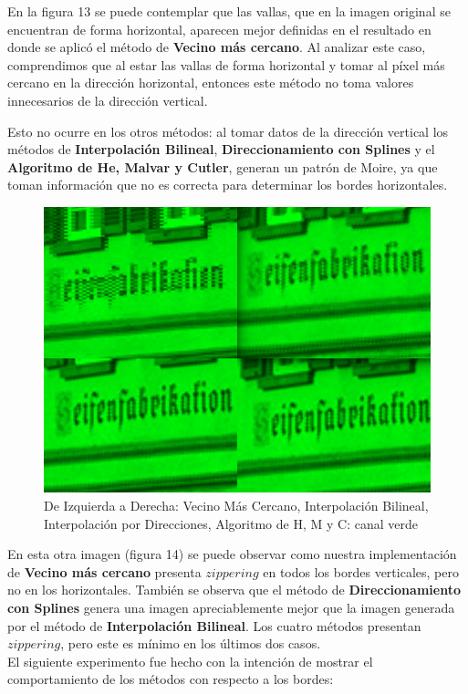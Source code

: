 \documentclass[a4paper]{article}
\begin{document}
En la figura 13 se puede contemplar que las vallas, que en la imagen original se encuentran de forma horizontal, aparecen mejor definidas en el resultado en donde se aplicó el método de \textbf{Vecino más cercano}. Al analizar este caso, comprendimos que al estar las vallas de forma horizontal y tomar al píxel más cercano en la dirección horizontal, entonces este método no toma valores innecesarios de la dirección vertical.

Esto no ocurre en los otros métodos: al tomar datos de la dirección vertical los métodos de \textbf{Interpolación Bilineal}, \textbf{Direccionamiento con Splines} y el \textbf{Algoritmo de He, Malvar y Cutler}, generan un patrón de Moire, ya que toman información que no es correcta para determinar los bordes horizontales.

\begin{figure}[h!]
\centering
\includegraphics[width=340pt]{img/Tomo3.png}
\caption{De Izquierda a Derecha: Vecino Más Cercano, Interpolación Bilineal, Interpolación por Direcciones, Algoritmo de H, M y C: canal verde}
\end{figure}

En esta otra imagen (figura 14) se puede observar como nuestra implementación de \textbf{Vecino más cercano} presenta $zippering$ en todos los bordes verticales, pero no en los horizontales. También se observa que el método de \textbf{Direccionamiento con Splines} genera una imagen apreciablemente mejor que la imagen generada por el método de \textbf{Interpolación Bilineal}. Los cuatro métodos presentan $zippering$, pero este es mínimo en los últimos dos casos.\\

El siguiente experimento fue hecho con la intención de mostrar el comportamiento de los métodos con respecto a los bordes:\\
\end{document}
